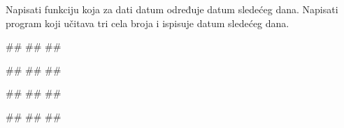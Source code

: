 \begin{Exercise}[label=p1.4_] 
Napisati funkciju  koja za dati datum određuje datum sledećeg dana. Napisati
program koji učitava tri cela broja i ispisuje datum sledećeg dana. 

\begin{miditest}
\begin{upotreba}{1}
#\naslovInt#
##
##
\end{upotreba}
\end{miditest}
\begin{miditest}
\begin{upotreba}{2}
#\naslovInt#
##
##
\end{upotreba}
\end{miditest}

\begin{miditest}
\begin{upotreba}{3}
#\naslovInt#
##
##
\end{upotreba}
\end{miditest}
\begin{miditest}
\begin{upotreba}{4}
#\naslovInt#
##
##
\end{upotreba}
\end{miditest}

\end{Exercise}

